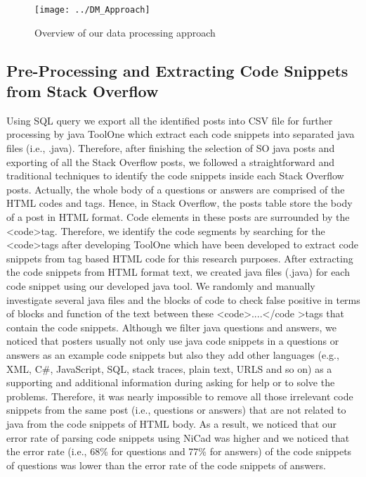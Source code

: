 \documentclass[conference]{IEEEtran}
\begin{document}
	\begin{figure*}[h]
		\centering
		\texttt{[image: ../DM\_Approach]}
		\caption{Overview of our data processing approach}
		\label{fig:dmapproach}
	\end{figure*}
	
	\subsection{Pre-Processing and Extracting Code Snippets from Stack Overflow}\label{AA}
	Using SQL query we export all the identified posts into CSV file for further processing by java ToolOne which extract each code snippets into separated java files (i.e., .java). Therefore, after finishing the selection of SO java posts and exporting of all the Stack Overflow posts, we followed a straightforward and traditional techniques to identify the code snippets inside each Stack Overflow posts. Actually, the whole body of a questions or answers are comprised of the HTML codes and tags. Hence, in Stack Overflow, the posts table store the body of a post in HTML format. Code elements in these posts are surrounded by the \textless code\textgreater  tag. Therefore, we identify the code segments by searching for the \textless code\textgreater tags after developing ToolOne which have been developed to extract code snippets from tag based HTML code for this research purposes. After extracting the code snippets from HTML format text, we created java files (.java) for each code snippet using our developed java tool. We randomly and manually investigate several java files and the blocks of code to check false positive in terms of blocks and function of the text between these \textless code\textgreater....\textless/code \textgreater tags that contain the code snippets. Although we filter java questions and answers, we noticed that posters usually not only use java code snippets in a questions or answers as an example code snippets but also they add other languages (e.g., XML, C\#, JavaScript, SQL, stack traces, plain text, URLS and so on) as a supporting and additional information during asking for help or to solve the problems. Therefore, it was nearly impossible to remove all those irrelevant code snippets from the same post (i.e., questions or answers) that are not related to java from the code snippets of HTML body. As a result, we noticed that our error rate of parsing code snippets using NiCad was higher and we noticed that the error rate (i.e., 68\% for questions and 77\%  for answers) of the code snippets of questions was lower than the error rate of the code snippets of answers. 
	
\end{document}
